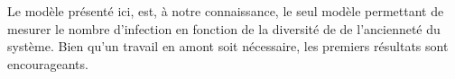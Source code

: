 Le modèle présenté ici, est, à notre connaissance, le seul modèle permettant de mesurer le nombre d'infection en fonction de la
diversité de de l'ancienneté du système. Bien qu'un travail en amont soit nécessaire, les premiers résultats sont encourageants. 
